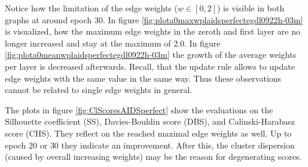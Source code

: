 		Notice how the limitation of the edge weights ($w\in[0,2]$) is visible in both graphs at around epoch $30$.
		In figure \ref{fig:plota0maxwplaidsperfectegdl0922h-03m} is visualized, how the maximum edge weights in the zeroth and first layer are no longer increased and stay at the maximum of $2.0$.
		In figure \ref{fig:plota0meanwplaidsperfectegdl0922h-03m} the growth of the average weights per layer is decreased afterwards.
		Recall, that the update rule allows to update edge weights with the same value in the same way.
		Thus these observations cannot be related to single edge weights in general.		
		
		The plots in figure \ref{fig:ClScoresAIDSperfect} show the evaluations on the Silhouette coefficient (SS), Davies-Bouldin score (DBS), and Calinski-Harabasz score (CHS).
		They reflect on the reached maximal edge weights as well.
		Up to epoch $20$ or $30$ they indicate an improvement. 
		After this, the cluster dispersion (caused by overall increasing weights) may be the reason for degenerating scores.
		
